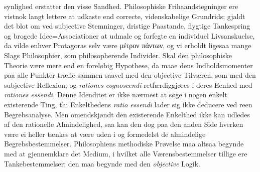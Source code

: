 \documentclass[12pt]{book}
\begin{document}
synlighed erstatter den visse Sandhed. Philosophiske Frihaandstegninger ere vistnok langt
lettere at udkaste end correcte, videnskabelige Grundrids; gjaldt det blot om ved subjective
Stemninger, dristige Paastande, flygtige Tankespring og brogede Idee=Associationer at udmale og
forfegte en individuel Livsanskuelse, da vilde enhver Protagoras selv være μέτρον πάντων, og vi
erholdt ligesaa mange Slags Philosophier, som philosopherende Individer. Skal den philosophiske
Theorie være mere end en foreløbig Hypothese, da maae dens Indholdsmomenter paa alle Punkter
træffe sammen saavel med den objective Tilværen, som med den subjective Reflexion, og
\textit{rationes cognoscendi} retfærdiggjøres i deres Eenhed med \textit{rationes essendi}.
Denne Idenditet er ikke nærmest at søge i nogen enkelt existerende Ting, thi Enkelthedens
\textit{ratio essendi} lader sig ikke deducere ved reen Begrebsanalyse. Men omendskjøndt den
existerende Enkelthed ikke kan udledes af den rationelle Almindelighed, saa kan den dog paa den
anden Side hverken være ei heller tænkes at være uden i og formedelst de almindelige
Begrebsbestemmelser. Philosophiens methodiske Prøvelse maa altsaa begynde med at gjennemklare
det Medium, i hvilket alle Værensbestemmelser tillige ere Tankebestemmelser; den maa begynde
med den \emph{objective} Logik.
\end{document}
